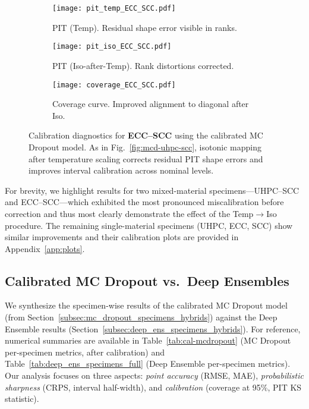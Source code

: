 \documentclass{article}
\begin{document}
\begin{figure*}[t]
  \centering
  \begin{subfigure}[t]{0.31\textwidth}
    \texttt{[image: pit\_temp\_ECC\_SCC.pdf]}
    \caption{PIT (Temp). Residual shape error visible in ranks.}
  \end{subfigure}\hfill
  \begin{subfigure}[t]{0.31\textwidth}
    \texttt{[image: pit\_iso\_ECC\_SCC.pdf]}
    \caption{PIT (Iso-after-Temp). Rank distortions corrected.}
  \end{subfigure}\hfill
  \begin{subfigure}[t]{0.31\textwidth}
    \texttt{[image: coverage\_ECC\_SCC.pdf]}
    \caption{Coverage curve. Improved alignment to diagonal after Iso.}
  \end{subfigure}
  \caption{Calibration diagnostics for \textbf{ECC--SCC} using the calibrated MC Dropout model. As in Fig.~\ref{fig:mcd-uhpc-scc}, isotonic mapping after temperature scaling corrects residual PIT shape errors and improves interval calibration across nominal levels.}
  \label{fig:mcd-ecc-scc}
\end{figure*}


For brevity, we highlight results for two mixed-material specimens—UHPC–SCC and ECC–SCC—which exhibited the most pronounced miscalibration before correction and thus most clearly demonstrate the effect of the Temp$\rightarrow$Iso procedure. The remaining single-material specimens (UHPC, ECC, SCC) show similar improvements and their calibration plots are provided in Appendix~\ref{app:plots}.


\subsection{Calibrated MC Dropout vs.\ Deep Ensembles}
\label{subsec:headtohead-calibrated-vs-ens}

We synthesize the specimen-wise results of the calibrated MC Dropout model (from Section~\ref{subsec:mc_dropout_specimens_hybrids}) against the Deep Ensemble results (Section~\ref{subsec:deep_ens_specimens_hybrids}). For reference, numerical summaries are available in Table~\ref{tab:cal-mcdropout} (MC Dropout per-specimen metrics, after calibration) and Table~\ref{tab:deep_ens_specimens_full} (Deep Ensemble per-specimen metrics). Our analysis focuses on three aspects: \emph{point accuracy} (RMSE, MAE), \emph{probabilistic sharpness} (CRPS, interval half-width), and \emph{calibration} (coverage at 95\%, PIT KS statistic).
\end{document}
